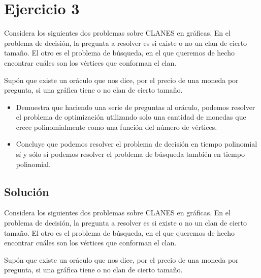 \section{Ejercicio 3}

\begin{tcolorbox}[enunciado]
Considera los siguientes dos problemas sobre CLANES en gráficas. En el problema de decisión, la pregunta a resolver es si existe o no un clan de cierto tamaño. El otro es el problema de búsqueda, en el que queremos de hecho encontrar cuáles son los vértices que conforman el clan.

Supón que existe un oráculo que nos dice, por el precio de una moneda por pregunta, si una gráfica tiene o no clan de cierto tamaño.
\begin{itemize}
    \item Demuestra que haciendo una serie de preguntas al oráculo, podemos resolver el problema de optimización utilizando solo una cantidad de monedas que crece polinomialmente como una función del número de vértices.
    \item Concluye que podemos resolver el problema de decisión en tiempo polinomial sí y sólo sí podemos resolver el problema de búsqueda también en tiempo polinomial.
\end{itemize}
\end{tcolorbox}

\subsection{Solución}

Considera los siguientes dos problemas sobre CLANES en gráficas. En el problema de decisión, la pregunta a resolver es si existe o no un clan de cierto tamaño. El otro es el problema de búsqueda, en el que queremos de hecho encontrar cuáles son los vértices que conforman el clan.

Supón que existe un oráculo que nos dice, por el precio de una moneda por pregunta, si una gráfica tiene o no clan de cierto tamaño.

